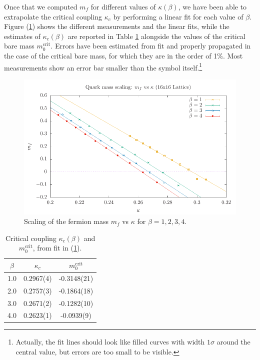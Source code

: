 Once that we computed $m_f$ for different values of $\kappa(\beta)$, we have been able to extrapolate the critical coupling $\kappa_c$ by performing a linear fit for each value of $\beta$. Figure (\ref{scaling mf}) shows the different measurements and the linear fits, while the estimates of $\kappa_c(\beta)$ are reported in Table \ref{tab:kc} alongside the values of the critical bare mass $m_0^{\textrm{crit}}$. Errors have been estimated from fit and properly propagated in the case of the critical bare mass, for which they are in the order of 1\%. Most measurements show an error bar smaller than the symbol itself.\footnote{Actually, the fit lines should look like filled curves with width $1\sigma$ around the central value, but errors are too small to be visible.}
\begin{figure}
    \centering
    \includegraphics[width=0.8\linewidth]{images/critical.pdf}
    \caption{Scaling of the fermion mass $m_f$ vs $\kappa$ for $\beta = 1, 2, 3, 4$.}
    \label{scaling mf}
\end{figure}
\begin{table}[H]
    \centering
    \begin{tabular}{c|c|c}
      $\beta$ & $\kappa_c$ & $m_0^{\textrm{crit}}$ \\
      \hline \hline 
       1.0  & 0.2967(4) & -0.3148(21) \\
       2.0 & 0.2757(3) & -0.1864(18) \\
       3.0 & 0.2671(2) & -0.1282(10) \\
       4.0 & 0.2623(1) & -0.0939(9) \\
    \end{tabular}
    \caption{Critical coupling $\kappa_c(\beta)$ and $m_0^{\textrm{crit}}$, from fit in (\ref{scaling mf}).}
    \label{tab:kc}
\end{table}

